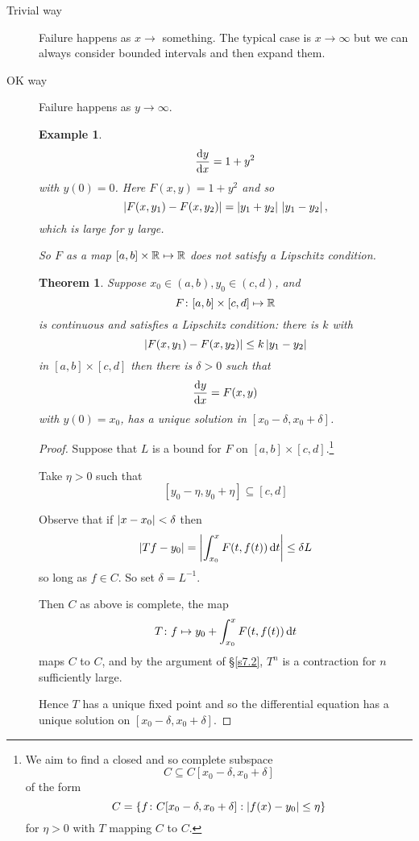 \documentclass{notes}
\theoremstyle{plain}
\newtheorem{theorem}[proposition]{Theorem}
\newtheorem{example}[proposition]{Example}
\begin{document}
\begin{description}
\item[Trivial way] Failure happens as $ x \to $ something. 
The typical case is $ x \to \infty $ but we can always 
consider bounded intervals and then expand them.

\item[OK way] Failure happens as $ y \to \infty $.

\begin{example}
\[ \frac{\mathrm{d} y}{\mathrm{d} x} = 1+y^{2} \] with $y(0)=0$.
Here $ F(x,y)=1+y^{2} $ and so
\[
\left|F(x,y_{1})-F(x,y_{2})\right| = \left|y_{1}+y_{2}\right| \, 
\left|y_{1}-y_{2}\right|,
\] which is large for $ y $ large.

So $ F $ as a map $ [a,b] \times \mathbb{R} \mapsto \mathbb{R} $ does not 
satisfy a Lipschitz condition.
\end{example}

\begin{theorem}
Suppose $ x_{0} \in (a,b), y_{0} \in (c,d) $, and \[ F\colon [a,b] 
\times [c,d] \mapsto \mathbb{R} \]
is continuous and satisfies a 
Lipschitz condition: there is $ k $ with
\[ \left|F(x,y_{1}) - F(x,y_{2})\right| \leq k\left|y_{1}-y_{2}\right| \] in $ 
[a,b] \times [c,d] $ then there is $ \delta>0$  such that  \[ 
\frac{\mathrm{d} y}{\mathrm{d} x} = F(x,y) \] with $ y(0)=x_{0} $, has a unique 
solution in $ [x_{0}-\delta, x_{0}+\delta] $.
\end{theorem}

\begin{proof}
Suppose that $ L $ is a bound for $ F $ on $ [a,b] \times [c,d] 
$.\footnote{
We aim to find a closed and so complete subspace \[ C \subseteq
C[x_{0}-\delta, x_{0}+\delta] \] of the form \[ C = \{ 
f\colon C[x_{0}-\delta, x_{0}+\delta] : \left|f(x)-y_{0}\right| \leq \eta \} \]
for $ \eta>0 $ with $ T $ mapping $ C $ to $ C $.
}

Take $ \eta >0 $ such that \[ [y_{0}-\eta, y_{0} + \eta] \subseteq 
[c,d] \]

Observe that if $ \left|x-x_{0}\right|< \delta  $ then
\[ \left|Tf-y_{0}\right| = \left|\int_{x_{0}}^{x} F(t,f(t)) \,\mathrm{d} t \right| \leq \delta L 
\] so long as $ f \in C $. So set $\delta = L^{-1}$.

Then $ C $ as above is complete, the map
\[ T\colon f  \mapsto y_{0} + \int_{x_{0}}^{x} F(t,f(t) )\,\mathrm{d} t \] maps $ C 
$ to $ C $, and by the argument of \S \ref{s7.2}, $ T^{n} $ is a 
contraction for $ n $ sufficiently large.

Hence $ T $ has a unique fixed point and so the differential 
equation has a unique solution on $[x_{0}-\delta, x_{0}+\delta]$.
\end{proof}


\end{description}
\end{document}
